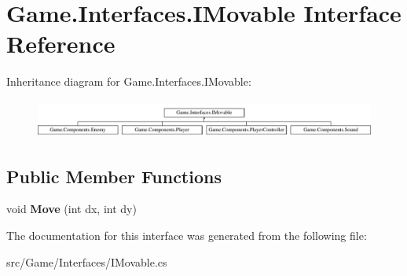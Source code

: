 \hypertarget{interface_game_1_1_interfaces_1_1_i_movable}{}\section{Game.\+Interfaces.\+I\+Movable Interface Reference}
\label{interface_game_1_1_interfaces_1_1_i_movable}
Inheritance diagram for Game.\+Interfaces.\+I\+Movable\+:\begin{figure}[H]
\begin{center}
\leavevmode
\includegraphics[height=1.261261cm]{interface_game_1_1_interfaces_1_1_i_movable}
\end{center}
\end{figure}
\subsection*{Public Member Functions}
\begin{DoxyCompactItemize}
\item 
\mbox{\label{interface_game_1_1_interfaces_1_1_i_movable_ae34f2a106867e1ff366086748c8dea7a}} 
void {\bfseries Move} (int dx, int dy)
\end{DoxyCompactItemize}


The documentation for this interface was generated from the following file\+:\begin{DoxyCompactItemize}
\item 
src/\+Game/\+Interfaces/I\+Movable.\+cs\end{DoxyCompactItemize}
